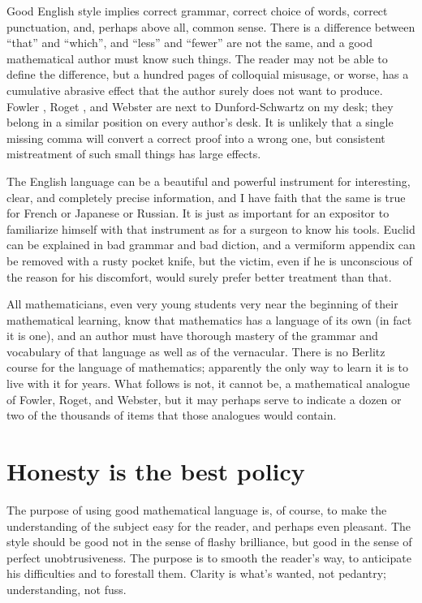 \documentclass[12pt]{article}
\begin{document}
Good English style implies correct grammar, correct choice of words, correct punctuation, and, perhaps above all, common sense. There is a difference between ``that'' and ``which'', and ``less'' and ``fewer'' are not the same, and a good mathematical author must know such things. The reader may not be able to define the difference, but a hundred pages of colloquial misusage, or worse, has a cumulative abrasive effect that the author surely does not want to produce. Fowler \cite{fowler1965modern}, Roget \cite{roget1946thesaurus}, and Webster \cite{webster1951dictionary} are next to Dunford-Schwartz on my desk; they belong in a similar position on every author's desk. It is unlikely that a single missing comma will convert a correct proof into a wrong one, but consistent mistreatment of such small things has large effects. 

The English language can be a beautiful and powerful instrument for interesting, clear, and completely precise information, and I have faith that the same is true for French or Japanese or Russian. It is just as important for an expositor to familiarize himself with that instrument as for a surgeon to know his tools. Euclid can be explained in bad grammar and bad diction, and a vermiform appendix can be removed with a rusty pocket knife, but the victim, even if he is unconscious of the reason for his discomfort, would surely prefer better treatment than that. 

All mathematicians, even very young students very near the beginning of their mathematical learning, know that mathematics has a language of its own (in fact it is one), and an author must have thorough mastery of the grammar and vocabulary of that language as well as of the vernacular. There is no Berlitz course for the language of mathematics; apparently the only way to learn it is to live with it for years. What follows is not, it cannot be, a mathematical analogue of Fowler, Roget, and Webster, but it may perhaps serve to indicate a dozen or two of the thousands of items that those analogues would contain. 

\section{Honesty is the best policy}

The purpose of using good mathematical language is, of course, to make the understanding of the subject easy for the reader, and perhaps even pleasant. The style should be good not in the sense of flashy brilliance, but good in the sense of perfect unobtrusiveness. The purpose is to smooth the reader's way, to anticipate his difficulties and to forestall them. Clarity is what's wanted, not pedantry; understanding, not fuss.
\end{document}
